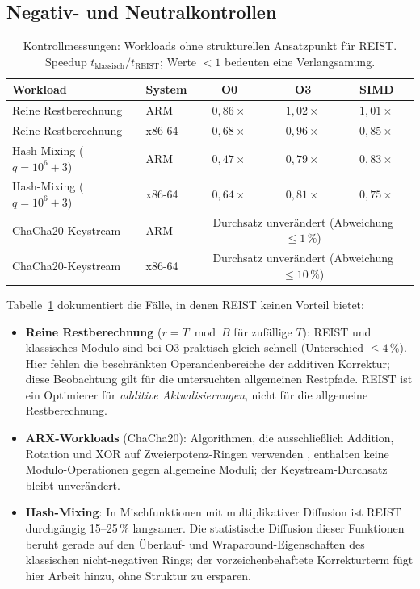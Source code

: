 \documentclass[11pt,a4paper]{scrartcl}
\theoremstyle{definition}
\theoremstyle{plain}
\theoremstyle{remark}
\begin{document}
\subsection{Negativ- und Neutralkontrollen}
\label{sec:kontrollen}

\begin{table}[htbp]
\centering
\caption{Kontrollmessungen: Workloads ohne strukturellen Ansatzpunkt für REIST. Speedup $t_{\text{klassisch}}/t_{\text{REIST}}$; Werte $<1$ bedeuten eine Verlangsamung.}
\label{tab:kontrollen}
\small
\begin{tabular}{llccc}
\toprule
Workload & System & O0 & O3 & SIMD \\
\midrule
Reine Restberechnung & ARM & $0{,}86\times$ & $1{,}02\times$ & $1{,}01\times$ \\
Reine Restberechnung & x86-64 & $0{,}68\times$ & $0{,}96\times$ & $0{,}85\times$ \\
\addlinespace
Hash-Mixing ($q = 10^6{+}3$) & ARM & $0{,}47\times$ & $0{,}79\times$ & $0{,}83\times$ \\
Hash-Mixing ($q = 10^6{+}3$) & x86-64 & $0{,}64\times$ & $0{,}81\times$ & $0{,}75\times$ \\
\addlinespace
ChaCha20-Keystream & ARM & \multicolumn{3}{c}{Durchsatz unverändert (Abweichung $\le 1\,\%$)} \\
ChaCha20-Keystream & x86-64 & \multicolumn{3}{c}{Durchsatz unverändert (Abweichung $\le 10\,\%$)} \\
\bottomrule
\end{tabular}
\end{table}

Tabelle~\ref{tab:kontrollen} dokumentiert die Fälle, in denen REIST keinen Vorteil bietet:

\begin{itemize}
\item \textbf{Reine Restberechnung} ($r = T \bmod B$ für zufällige $T$): REIST und klassisches Modulo sind bei O3 praktisch gleich schnell (Unterschied $\le 4\,\%$). Hier fehlen die beschränkten Operandenbereiche der additiven Korrektur; diese Beobachtung gilt für die untersuchten allgemeinen Restpfade. REIST ist ein Optimierer für \emph{additive Aktualisierungen}, nicht für die allgemeine Restberechnung.
\item \textbf{ARX-Workloads} (ChaCha20): Algorithmen, die ausschließlich Addition, Rotation und XOR auf Zweierpotenz-Ringen verwenden \cite{chacha}, enthalten keine Modulo-Operationen gegen allgemeine Moduli; der Keystream-Durchsatz bleibt unverändert.
\item \textbf{Hash-Mixing}: In Mischfunktionen mit multiplikativer Diffusion ist REIST durchgängig 15--25\,\% langsamer. Die statistische Diffusion dieser Funktionen beruht gerade auf den Überlauf- und Wraparound-Eigenschaften des klassischen nicht-negativen Rings; der vorzeichenbehaftete Korrekturterm fügt hier Arbeit hinzu, ohne Struktur zu ersparen.
\end{itemize}
\end{document}
